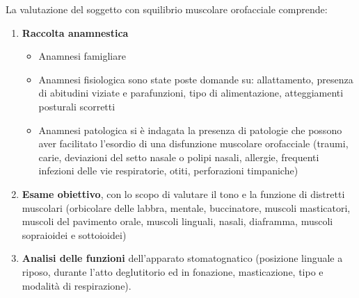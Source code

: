 La valutazione del soggetto con squilibrio muscolare orofacciale comprende: 
\begin{enumerate}
\item \textbf{Raccolta anamnestica}
\begin{itemize}
 \item Anamnesi famigliare
 \item Anamnesi fisiologica sono state poste domande su: allattamento, presenza di abitudini viziate e parafunzioni, tipo di alimentazione, atteggiamenti posturali scorretti
  \item Anamnesi patologica si è indagata la presenza di patologie che possono aver facilitato l'esordio di una disfunzione muscolare orofacciale (traumi, carie, deviazioni del setto nasale o polipi nasali, allergie, frequenti infezioni delle vie respiratorie, otiti, perforazioni timpaniche)
\end{itemize}
\item \textbf{Esame obiettivo}, con lo scopo di valutare il tono e la funzione di distretti muscolari (orbicolare delle labbra, mentale, buccinatore, muscoli masticatori, muscoli del pavimento orale, muscoli linguali, nasali, diaframma, muscoli sopraioidei e sottoioidei)
\item \textbf{Analisi delle funzioni} dell'apparato stomatognatico (posizione linguale a riposo, durante l'atto deglutitorio ed in fonazione, masticazione, tipo e modalità di respirazione).
\end{enumerate}


